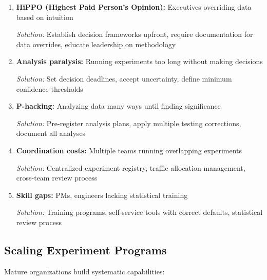 \begin{enumerate}
    \item \textbf{HiPPO (Highest Paid Person's Opinion):} Executives overriding data based on intuition

    \textit{Solution:} Establish decision frameworks upfront, require documentation for data overrides, educate leadership on methodology

    \item \textbf{Analysis paralysis:} Running experiments too long without making decisions

    \textit{Solution:} Set decision deadlines, accept uncertainty, define minimum confidence thresholds

    \item \textbf{P-hacking:} Analyzing data many ways until finding significance

    \textit{Solution:} Pre-register analysis plans, apply multiple testing corrections, document all analyses

    \item \textbf{Coordination costs:} Multiple teams running overlapping experiments

    \textit{Solution:} Centralized experiment registry, traffic allocation management, cross-team review process

    \item \textbf{Skill gaps:} PMs, engineers lacking statistical training

    \textit{Solution:} Training programs, self-service tools with correct defaults, statistical review process
\end{enumerate}

\subsection{Scaling Experiment Programs}

Mature organizations build systematic capabilities:

